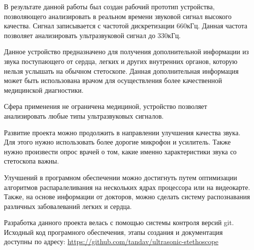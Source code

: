 \documentclass[../paper.tex]{subfiles}
\begin{document}
В результате данной работы был создан рабочий прототип устройства, позволяющего анализировать в реальном времени звуковой сигнал высокого качества. Сигнал записывается с частотой дискретизации 660кГц. Данная частота позволяет анализировать ультразвуковой сигнал до 330кГц.

Данное устройство предназначено для получения дополнительной информации из звука поступающего от сердца, легких и других внутренних органов, которую нельзя услышать на обычном стетоскопе. Данная дополнительная информация может быть использована врачом для осуществления более качественной медицинской диагностики.

Сфера применения не ограничена медициной, устройство позволяет анализировать любые типы ультразвуковых сигналов.

Развитие проекта можно продолжить в направлении улучшения качества звука. Для этого нужно использовать более дорогие микрофон и усилитель. Также нужно произвести опрос врачей о том, какие именно характеристики звука со стетоскопа важны.

Улучшений в програмном обеспечении можно достигнуть путем оптимизации алгоритмов распаралеливания на нескольких ядрах процессора или на видеокарте. Также, на основе информации от докторов, можно сделать систему распознавания различных забовалеваний легких и сердца.

Разработка данного проекта велась с помощью системы контроля версий git. Исходный код програмного обеспечения, этапы создания и документация доступны по адресу: \url{https://github.com/tandav/ultrasonic-stethoscope}
\end{document}

